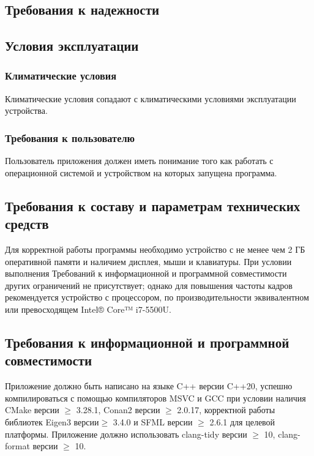 \documentclass{../TechDoc}
\begin{document}
    

    \subsection{Требования к надежности}
        
    

    \subsection{Условия эксплуатации}
    
    \subsubsection{Климатические условия}
    
    Климатические условия сопадают с климатическими условиями эксплуатации устройства.

    \subsubsection{Требования к пользователю}
    
    Пользователь приложения должен иметь понимание того как работать с операционной системой и устройством на которых запущена программа.

    \subsection{Требования к составу и параметрам технических средств}
    
    Для корректной работы программы необходимо устройство с не менее чем 2 ГБ оперативной памяти и наличием дисплея, мыши и клавиатуры.
    При условии выполнения Требований к информационной и программной совместимости других ограничений не присутствует; однако для повышения частоты кадров рекомендуется устройство с процессором, по производительности эквивалентном или превосходящем Intel® Core™ i7-5500U.
    
    \subsection{Требования к информационной и программной совместимости}
    
    Приложение должно быть написано на языке C++ версии C++20, успешно компилироваться с помощью компиляторов MSVC и GCC при условии наличия CMake версии $\geq$ 3.28.1, Conan2 версии $\geq$  2.0.17, корректной работы библиотек Eigen3 версии$ \geq$  3.4.0 и SFML версии $\geq$  2.6.1 для целевой платформы. 
    Приложение должно использовать clang-tidy версии $\geq$ 10, clang-format версии $\geq$ 10.
    
\end{document}
